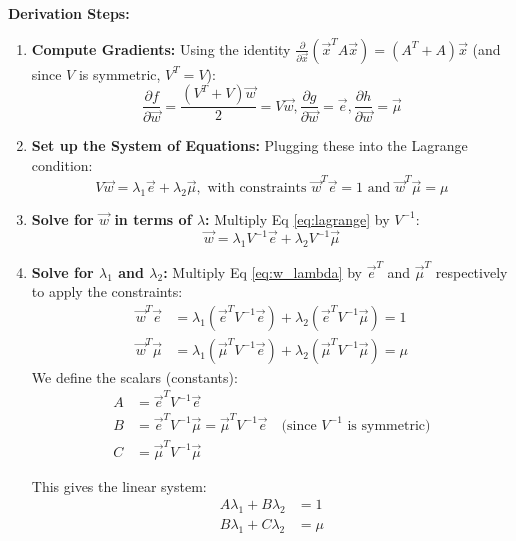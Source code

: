 \textbf{Derivation Steps:}
\begin{enumerate}
    \item \textbf{Compute Gradients:}
    Using the identity $\frac{\partial}{\partial \vec{x}}(\vec{x}^T A \vec{x}) = (A^T + A)\vec{x}$ (and since $V$ is symmetric, $V^T=V$):
    \begin{equation*}
        \frac{\partial f}{\partial \vec{w}} = \frac{(V^T + V)\vec{w}}{2} = V\vec{w}, \frac{\partial g}{\partial \vec{w}} = \vec{e}, \frac{\partial h}{\partial \vec{w}} = \vec{\mu}
    \end{equation*}

    \item \textbf{Set up the System of Equations:}
    Plugging these into the Lagrange condition:
    \begin{equation} \label{eq:lagrange}
        V\vec{w} = \lambda_1 \vec{e} + \lambda_2 \vec{\mu}, \text{ with constraints }         \vec{w}^T \vec{e} = 1 \text{ and } \vec{w}^T \vec{\mu} = \mu
    \end{equation}

    \item \textbf{Solve for $\vec{w}$ in terms of $\lambda$:}
    Multiply Eq \eqref{eq:lagrange} by $V^{-1}$:
    \begin{equation} \label{eq:w_lambda}
        \vec{w} = \lambda_1 V^{-1}\vec{e} + \lambda_2 V^{-1}\vec{\mu}
    \end{equation}

    \item \textbf{Solve for $\lambda_1$ and $\lambda_2$:}
    Multiply Eq \eqref{eq:w_lambda} by $\vec{e}^T$ and $\vec{\mu}^T$ respectively to apply the constraints:
    \begin{align*}
        \vec{w}^T \vec{e} &= \lambda_1 (\vec{e}^T V^{-1} \vec{e}) + \lambda_2 (\vec{e}^T V^{-1} \vec{\mu}) = 1 \\
        \vec{w}^T \vec{\mu} &= \lambda_1 (\vec{\mu}^T V^{-1} \vec{e}) + \lambda_2 (\vec{\mu}^T V^{-1} \vec{\mu}) = \mu
    \end{align*}
    We define the scalars (constants):
    \begin{align*}
        A &= \vec{e}^T V^{-1} \vec{e} \\
        B &= \vec{e}^T V^{-1} \vec{\mu} = \vec{\mu}^T V^{-1} \vec{e} \quad \text{(since $V^{-1}$ is symmetric)} \\
        C &= \vec{\mu}^T V^{-1} \vec{\mu}
    \end{align*}

    This gives the linear system:
    \begin{align*}
        A\lambda_1 + B\lambda_2 &= 1 \\
        B\lambda_1 + C\lambda_2 &= \mu
    \end{align*}


\end{enumerate}
